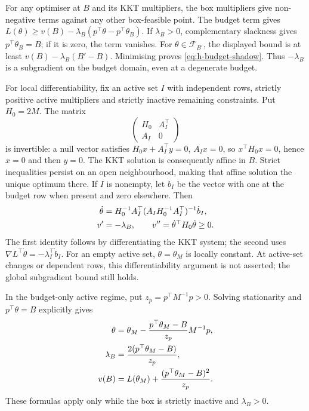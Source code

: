 \documentclass[11pt]{article}
\begin{document}
For any optimiser at $B$ and its KKT multipliers, the box multipliers
give non-negative terms against any other box-feasible point.
The budget term gives
$L(\theta)\geq v(B)-\lambda_B(p^\top\theta-p^\top\theta_B)$.
If $\lambda_B>0$, complementary slackness gives $p^\top\theta_B=B$;
if it is zero, the term vanishes. For $\theta\in\mathcal F_{B'}$,
the displayed bound is at least $v(B)-\lambda_B(B'-B)$.
Minimising proves \eqref{eq:h-budget-shadow}. Thus $-\lambda_B$
is a subgradient on the budget domain, even at a degenerate budget.

For local differentiability, fix an active set $I$ with independent
rows, strictly positive active multipliers and strictly inactive
remaining constraints. Put $H_0=2M$. The matrix
\begin{equation}
 \begin{pmatrix}H_0&A_I^\top\\A_I&0\end{pmatrix}
 \label{eq:h-kkt-system}
\end{equation}
is invertible: a null vector satisfies $H_0x+A_I^\top y=0$,
$A_Ix=0$, so $x^\top H_0x=0$, hence $x=0$ and then $y=0$.
The KKT solution is consequently affine in $B$. Strict inequalities
persist on an open neighbourhood, making that affine solution the
unique optimum there. If $I$ is nonempty, let $\dot b_I$ be the vector
with one at the budget row when present and zero elsewhere. Then
\begin{align}
 \dot\theta&=H_0^{-1}A_I^\top
 (A_IH_0^{-1}A_I^\top)^{-1}\dot b_I,\notag\\
 v'&=-\lambda_B,\qquad v''=\dot\theta^\top H_0\dot\theta\geq0.
 \label{eq:h-local-budget-sensitivity}
\end{align}
The first identity follows by differentiating the KKT system; the
second uses $\nabla L^\top\dot\theta=-\lambda_I^\top\dot b_I$.
For an empty active set, $\theta=\theta_M$ is locally constant.
At active-set changes or dependent rows, this differentiability
argument is not asserted; the global subgradient bound still holds.

In the budget-only active regime, put $z_p=p^\top M^{-1}p>0$.
Solving stationarity and $p^\top\theta=B$ explicitly gives
\begin{align}
 \theta&=\theta_M-\frac{p^\top\theta_M-B}{z_p}M^{-1}p,\notag\\
 \lambda_B&=\frac{2(p^\top\theta_M-B)}{z_p},\notag\\
 v(B)&=L(\theta_M)+\frac{(p^\top\theta_M-B)^2}{z_p}.
 \label{eq:h-budget-only-regime}
\end{align}
These formulas apply only while the box is strictly inactive and
$\lambda_B>0$.
\end{document}

